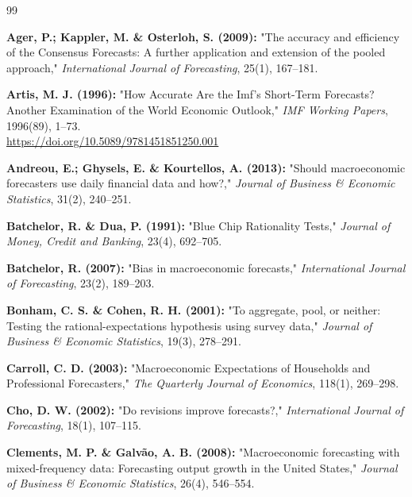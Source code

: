 \documentclass[12pt,a4paper]{article}
\begin{document}
		
\label{sec:references}
\renewcommand{\refname}{Bibliography}
\begin{thebibliography}{99}
	
	
	
	\textbf{Ager, P.; Kappler, M. \& Osterloh, S. (2009):}
	"The accuracy and efficiency of the Consensus Forecasts: A further application and extension of the pooled approach,"
	\emph{International Journal of Forecasting}, 25(1), 167--181.
	
	\textbf{Artis, M. J. (1996):}
	"How Accurate Are the Imf's Short-Term Forecasts? Another Examination of the World Economic Outlook,"
	\emph{IMF Working Papers}, 1996(89), 1--73.\\
	\url{https://doi.org/10.5089/9781451851250.001}
	
	\textbf{Andreou, E.; Ghysels, E. \& Kourtellos, A. (2013):}
	"Should macroeconomic forecasters use daily financial data and how?,"
	\emph{Journal of Business \& Economic Statistics}, 31(2), 240--251.	
	
	\textbf{Batchelor, R. \& Dua, P. (1991):}
	"Blue Chip Rationality Tests,"
	\emph{Journal of Money, Credit and Banking}, 23(4), 692--705.
	
	\textbf{Batchelor, R. (2007):}
	"Bias in macroeconomic forecasts,"
	\emph{International Journal of Forecasting}, 23(2), 189--203.
	
	\textbf{Bonham, C. S. \& Cohen, R. H. (2001):}
	"To aggregate, pool, or neither: Testing the rational-expectations hypothesis using survey data,"
	\emph{Journal of Business \& Economic Statistics}, 19(3), 278--291.
	
	\textbf{Carroll, C. D. (2003):}
	"Macroeconomic Expectations of Households and Professional Forecasters,"
	\emph{The Quarterly Journal of Economics}, 118(1), 269--298.
	
	\textbf{Cho, D. W. (2002):}
	"Do revisions improve forecasts?,"
	\emph{International Journal of Forecasting}, 18(1), 107--115.
	
	\textbf{Clements, M. P. \& Galvão, A. B. (2008):}
	"Macroeconomic forecasting with mixed-frequency data: Forecasting output growth in the United States,"
	\emph{Journal of Business \& Economic Statistics}, 26(4), 546--554.
	

\end{thebibliography}
\end{document}
